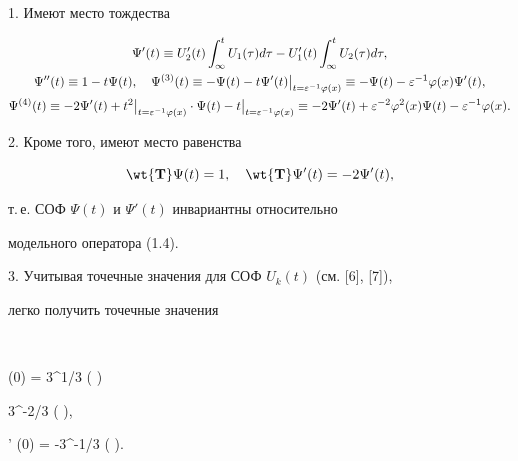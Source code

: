 1. Имеют место тождества


\begin{gather}


\Psi' (t) \equiv U_2 ' (t) \int _{\infty}^t U_1 (\tau) d \tau -


U_1 '(t) \int _{\infty}^t U_2 (\tau) d \tau,\notag \\


%


\Psi'' (t) \equiv 1 - t \Psi (t), \quad


\Psi^{(3)} (t) \equiv - \Psi (t) - t \Psi' (t)


\big|_{t= \e^{-1} \f(x)} \equiv -\Psi (t) -


\varepsilon^{-1} \f (x) \Psi' (t),\\


%


\Psi^{(4)} (t) \equiv -2 \Psi'(t) + t^2


\big|_{t= \e^{-1} \f(x)}


\cdot \Psi (t) -t


\big|_{t= \e^{-1} \f(x)}\equiv


-2 \Psi' (t) + \e^{-2} \f^2 (x) \Psi (t)- \varepsilon^{-1} \f (x).\notag


\end{gather}





2. Кроме того, имеют место равенства


\begin{equation}


\wt{\bold T}\Psi (t) = 1, \quad \wt{\bold T} \Psi'(t) = -2\Psi' (t),


\end{equation}


т.\,е. СОФ $\Psi (t)$ и $\Psi ' (t)$ инвариантны относительно


модельного оператора (1.4).





3. Учитывая точечные значения для СОФ $U_k (t)$ (см. [6], [7]),


легко получить точечные значения


$$


\Psi (0) = 3^{{1}/{3}} \Gamma \left(  \right) \equiv


3^{{-2}/{3}} \Gamma \left(  \right), \quad


\Psi ' (0) = -3^{{-1}/{3}} \Gamma \left(  \right).


